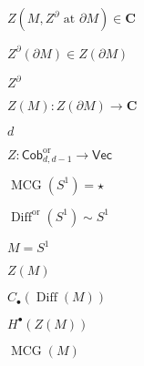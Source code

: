 \begin{preview}
\setcounter{equation}{0}%
\( Z(M , Z^{\partial} \text{ at } \partial M)\in \mathbf{C} \)
\end{preview}

\begin{preview}
\setcounter{equation}{0}%
\( Z^{\partial}( \partial M) \in Z( \partial M) \)
\end{preview}

\begin{preview}
\setcounter{equation}{0}%
\( Z^{\partial} \)
\end{preview}

\begin{preview}
\setcounter{equation}{0}%
\( Z(M) : Z( \partial M) \to \mathbf{C} \)
\end{preview}

\begin{preview}
\setcounter{equation}{0}%
\( d \)
\end{preview}

\begin{preview}
\setcounter{equation}{0}%
\( Z : \mathsf{Cob}_{d,d-1}^{\mathrm{or}} \to \mathsf{Vec} \)
\end{preview}

\begin{preview}
\setcounter{equation}{0}%
\( \operatorname{MCG}(S^1) = \star \)
\end{preview}

\begin{preview}
\setcounter{equation}{0}%
\( \operatorname{Diff}^{\mathrm{or}}(S^1) \sim S^1 \)
\end{preview}

\begin{preview}
\setcounter{equation}{0}%
\( M = S^1 \)
\end{preview}

\begin{preview}
\setcounter{equation}{0}%
\( Z(M) \)
\end{preview}

\begin{preview}
\setcounter{equation}{0}%
\( C_{\bullet}(\operatorname{Diff}(M)) \)
\end{preview}

\begin{preview}
\setcounter{equation}{0}%
\( H^{\bullet}(Z(M)) \)
\end{preview}

\begin{preview}
\setcounter{equation}{0}%
\( \operatorname{MCG}(M) \)
\end{preview}

